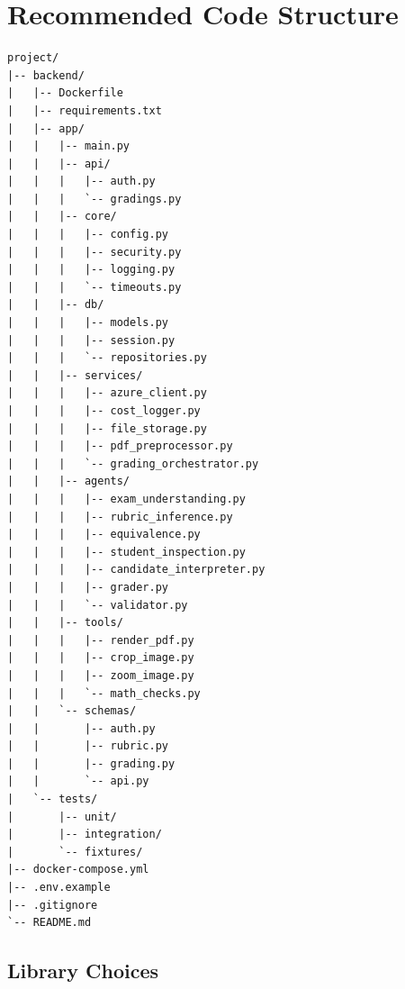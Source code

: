 \documentclass[11pt,a4paper]{article}
\begin{document}
\section{Recommended Code Structure}

\begin{lstlisting}
project/
|-- backend/
|   |-- Dockerfile
|   |-- requirements.txt
|   |-- app/
|   |   |-- main.py
|   |   |-- api/
|   |   |   |-- auth.py
|   |   |   `-- gradings.py
|   |   |-- core/
|   |   |   |-- config.py
|   |   |   |-- security.py
|   |   |   |-- logging.py
|   |   |   `-- timeouts.py
|   |   |-- db/
|   |   |   |-- models.py
|   |   |   |-- session.py
|   |   |   `-- repositories.py
|   |   |-- services/
|   |   |   |-- azure_client.py
|   |   |   |-- cost_logger.py
|   |   |   |-- file_storage.py
|   |   |   |-- pdf_preprocessor.py
|   |   |   `-- grading_orchestrator.py
|   |   |-- agents/
|   |   |   |-- exam_understanding.py
|   |   |   |-- rubric_inference.py
|   |   |   |-- equivalence.py
|   |   |   |-- student_inspection.py
|   |   |   |-- candidate_interpreter.py
|   |   |   |-- grader.py
|   |   |   `-- validator.py
|   |   |-- tools/
|   |   |   |-- render_pdf.py
|   |   |   |-- crop_image.py
|   |   |   |-- zoom_image.py
|   |   |   `-- math_checks.py
|   |   `-- schemas/
|   |       |-- auth.py
|   |       |-- rubric.py
|   |       |-- grading.py
|   |       `-- api.py
|   `-- tests/
|       |-- unit/
|       |-- integration/
|       `-- fixtures/
|-- docker-compose.yml
|-- .env.example
|-- .gitignore
`-- README.md
\end{lstlisting}

\subsection{Library Choices}
\end{document}
